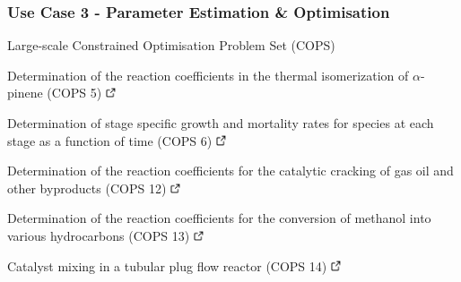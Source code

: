 \documentclass[compress,newPxFont,sthlmFooter]{beamer}
\begin{document}
\begin{frame}[plain]
\frametitle{Use Case 3 - Parameter Estimation \& Optimisation}
    \begin{center}
        {\small
            \alert{Large-scale Constrained Optimisation Problem Set (COPS)}
        }
    \end{center}  
    \begin{itemize}
      {\small
          \item Determination of the reaction coefficients in the thermal isomerization of $\alpha$-pinene (COPS 5)
                \href{http://daetools.com/docs/tutorials-chemeng-optimisation.html\#tutorial-che-opt-2}{\includegraphics[align=b, height=0.8em]{link.png}}
          \item Determination of stage specific growth and mortality rates for species at each stage as a function of time (COPS 6)
                \href{http://daetools.com/docs/tutorials-chemeng-optimisation.html\#tutorial-che-opt-3}{\includegraphics[align=b, height=0.8em]{link.png}}
          \item Determination of the reaction coefficients for the catalytic cracking of gas oil and other byproducts (COPS 12)
                \href{http://daetools.com/docs/tutorials-chemeng-optimisation.html\#tutorial-che-opt-4}{\includegraphics[align=b, height=0.8em]{link.png}}
          \item Determination of the reaction coefficients for the conversion of methanol into various hydrocarbons (COPS 13)
                \href{http://daetools.com/docs/tutorials-chemeng-optimisation.html\#tutorial-che-opt-5}{\includegraphics[align=b, height=0.8em]{link.png}}
          \item Catalyst mixing in a tubular plug flow reactor (COPS 14)
                \href{http://daetools.com/docs/tutorials-chemeng-optimisation.html\#tutorial-che-opt-6}{\includegraphics[align=b, height=0.8em]{link.png}}
      }
    \end{itemize}
\end{frame}
\end{document}
